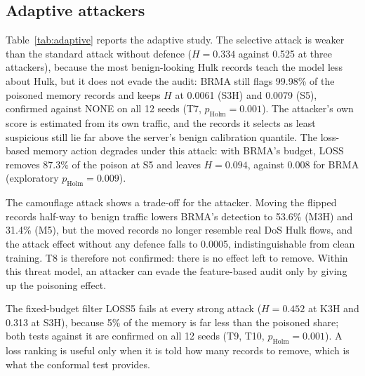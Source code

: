 \documentclass[pdflatex,sn-mathphys-num]{sn-jnl}
\theoremstyle{thmstyleone}
\theoremstyle{thmstylethree}
\begin{document}
\subsection{Adaptive attackers}\label{sec:adaptive}
Table~\ref{tab:adaptive} reports the adaptive study. The selective attack is weaker than the standard attack without defence ($H=0.334$ against 0.525 at three attackers), because the most benign-looking Hulk records teach the model less about Hulk, but it does not evade the audit: BRMA still flags 99.98\% of the poisoned memory records and keeps $H$ at 0.0061 (S3H) and 0.0079 (S5), confirmed against NONE on all 12 seeds (T7, $p_{\mathrm{Holm}}=0.001$). The attacker's own score is estimated from its own traffic, and the records it selects as least suspicious still lie far above the server's benign calibration quantile. The loss-based memory action degrades under this attack: with BRMA's budget, LOSS removes 87.3\% of the poison at S5 and leaves $H=0.094$, against 0.008 for BRMA (exploratory $p_{\mathrm{Holm}}=0.009$).

The camouflage attack shows a trade-off for the attacker. Moving the flipped records half-way to benign traffic lowers BRMA's detection to 53.6\% (M3H) and 31.4\% (M5), but the moved records no longer resemble real DoS Hulk flows, and the attack effect without any defence falls to 0.0005, indistinguishable from clean training. T8 is therefore not confirmed: there is no effect left to remove. Within this threat model, an attacker can evade the feature-based audit only by giving up the poisoning effect.

The fixed-budget filter LOSS5 fails at every strong attack ($H=0.452$ at K3H and 0.313 at S3H), because 5\% of the memory is far less than the poisoned share; both tests against it are confirmed on all 12 seeds (T9, T10, $p_{\mathrm{Holm}}=0.001$). A loss ranking is useful only when it is told how many records to remove, which is what the conformal test provides.
\end{document}

